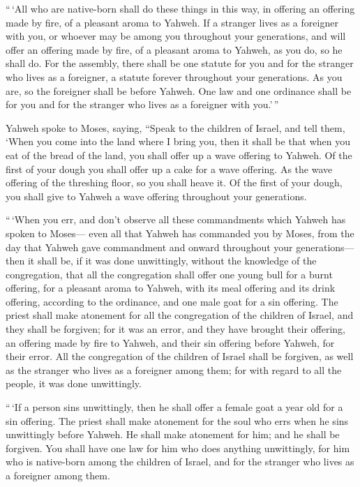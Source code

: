  ``\,`All who are native-born shall do these things in this
way, in offering an offering made by fire, of a pleasant aroma to
Yahweh.  If a stranger lives as a foreigner with you, or
whoever may be among you throughout your generations, and will offer an
offering made by fire, of a pleasant aroma to Yahweh, as you do, so he
shall do.  For the assembly, there shall be one statute for
you and for the stranger who lives as a foreigner, a statute forever
throughout your generations. As you are, so the foreigner shall be
before Yahweh.  One law and one ordinance shall be for you
and for the stranger who lives as a foreigner with you.'\,''

 Yahweh spoke to Moses, saying,  ``Speak to
the children of Israel, and tell them, `When you come into the land
where I bring you,  then it shall be that when you eat of
the bread of the land, you shall offer up a wave offering to Yahweh.
 Of the first of your dough you shall offer up a cake for a
wave offering. As the wave offering of the threshing floor, so you shall
heave it.  Of the first of your dough, you shall give to
Yahweh a wave offering throughout your generations.

 ``\,`When you err, and don't observe all these
commandments which Yahweh has spoken to Moses---  even all
that Yahweh has commanded you by Moses, from the day that Yahweh gave
commandment and onward throughout your generations---  then
it shall be, if it was done unwittingly, without the knowledge of the
congregation, that all the congregation shall offer one young bull for a
burnt offering, for a pleasant aroma to Yahweh, with its meal offering
and its drink offering, according to the ordinance, and one male goat
for a sin offering.  The priest shall make atonement for
all the congregation of the children of Israel, and they shall be
forgiven; for it was an error, and they have brought their offering, an
offering made by fire to Yahweh, and their sin offering before Yahweh,
for their error.  All the congregation of the children of
Israel shall be forgiven, as well as the stranger who lives as a
foreigner among them; for with regard to all the people, it was done
unwittingly.

 ``\,`If a person sins unwittingly, then he shall offer a
female goat a year old for a sin offering.  The priest
shall make atonement for the soul who errs when he sins unwittingly
before Yahweh. He shall make atonement for him; and he shall be
forgiven.  You shall have one law for him who does anything
unwittingly, for him who is native-born among the children of Israel,
and for the stranger who lives as a foreigner among them.

